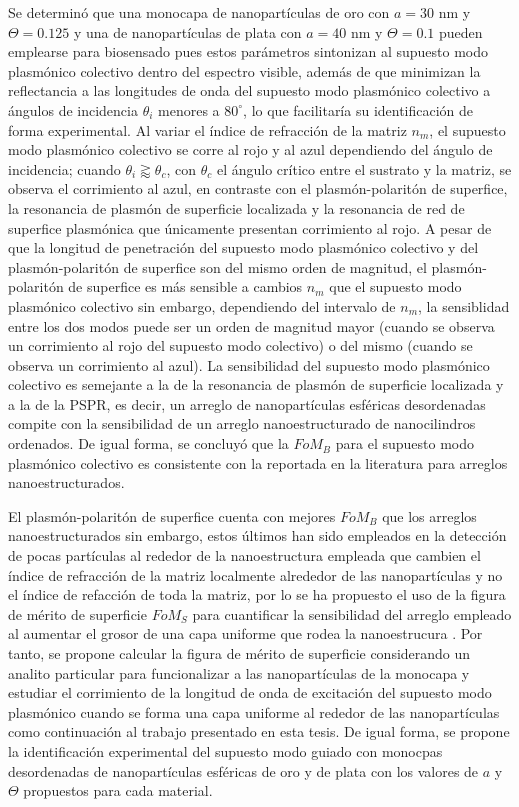 Se determinó que una monocapa de nanopartículas de oro con $a=30$ nm y $\Theta=0.125$ y una de nanopartículas de plata con $a=40$ nm y $\Theta=0.1$ pueden emplearse para biosensado pues estos parámetros sintonizan al supuesto modo plasmónico colectivo dentro del espectro visible, además de que minimizan la reflectancia a las longitudes de onda del supuesto modo plasmónico colectivo a ángulos de incidencia $\theta_i$ menores a $80^\circ$, lo que facilitaría su identificación de forma experimental. Al variar el índice de refracción de la matriz $n_m$, el supuesto modo plasmónico colectivo se corre al rojo y al azul dependiendo del ángulo de incidencia; cuando $\theta_i\gtrapprox\theta_c$, con $\theta_c$ el ángulo crítico entre el sustrato y la matriz, se observa el corrimiento al azul, en contraste con el plasmón-polaritón de superfice, la resonancia de plasmón de superficie localizada y la resonancia de red de superfice plasmónica que únicamente presentan corrimiento al rojo. A pesar de que la longitud de penetración del supuesto modo plasmónico colectivo y del plasmón-polaritón de superfice son del mismo orden de magnitud, el plasmón-polaritón de superfice es más sensible a cambios $n_m$ que el supuesto modo plasmónico colectivo sin embargo, dependiendo del intervalo de $n_m$, la sensiblidad entre los dos modos puede ser un orden de magnitud mayor (cuando se observa un corrimiento al rojo del supuesto modo colectivo) o del mismo (cuando se observa un corrimiento al azul). La sensibilidad del supuesto modo  plasmónico colectivo es semejante a la de la resonancia de plasmón de superficie localizada y a la de la PSPR, es decir, un arreglo de nanopartículas esféricas desordenadas compite con la sensibilidad de un arreglo nanoestructurado de nanocilindros ordenados. De igual forma, se concluyó que la $\textit{FoM}_B$ para el supuesto modo plasmónico colectivo es consistente con la reportada en la literatura para arreglos nanoestructurados.

El plasmón-polaritón de superfice cuenta con mejores $\textit{FoM}_B$ que los arreglos nanoestructurados sin embargo, estos últimos han sido empleados en la detección de pocas partículas al rededor de la nanoestructura empleada que cambien el índice de refracción de la matriz localmente alrededor de las nanopartículas y no el índice de refacción de toda la matriz, por lo se ha propuesto el uso de la figura de mérito de superficie $\textit{FoM}_S$ para cuantificar la sensibilidad del arreglo empleado al aumentar el grosor de una capa uniforme que rodea la nanoestrucura \cite{estevez2014trends,svedendahl2009refractometric}. Por tanto, se propone calcular la figura de mérito de superficie considerando un analito particular para funcionalizar a las nanopartículas de la monocapa y estudiar el corrimiento de la longitud de onda de excitación del supuesto modo plasmónico cuando se forma una capa uniforme al rededor de las nanopartículas como continuación al trabajo presentado en esta tesis. De igual forma, se propone la identificación experimental del supuesto modo guiado con monocpas desordenadas de nanopartículas esféricas de oro y de plata con los valores de $a$ y $\Theta$ propuestos para cada material. 
